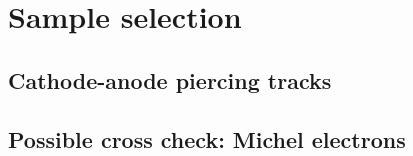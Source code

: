 \section{Sample selection}\label{sec:SampleSelection}

\subsection{Cathode-anode piercing tracks}\label{sec:CAPiercing}

\subsection{Possible cross check: Michel electrons}\label{sec:ME}

 

